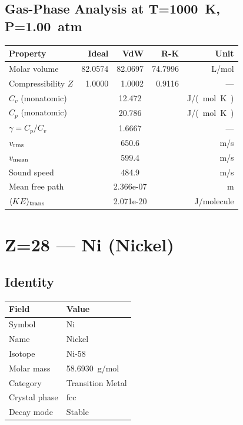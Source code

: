\documentclass[11pt,a4paper]{article}
\begin{document}
\subsection{Gas-Phase Analysis at T=\SI{1000}{K}, P=\SI{1.00}{atm}}
\begin{tabular}{lrrrr}
  \toprule
  Property & Ideal & VdW & R-K & Unit \\
  \midrule
  Molar volume & 82.0574 & 82.0697 & 74.7996 & \si{L/mol} \\
  Compressibility $Z$ & 1.0000 & 1.0002 & 0.9116 & --- \\
  \midrule
  $C_v$ (monatomic) & \multicolumn{3}{c}{12.472} & \si{J/(mol.K)} \\
  $C_p$ (monatomic) & \multicolumn{3}{c}{20.786} & \si{J/(mol.K)} \\
  $\gamma = C_p/C_v$ & \multicolumn{3}{c}{1.6667} & --- \\
  $v_{\rm rms}$ & \multicolumn{3}{c}{650.6} & \si{m/s} \\
  $v_{\rm mean}$ & \multicolumn{3}{c}{599.4} & \si{m/s} \\
  Sound speed & \multicolumn{3}{c}{484.9} & \si{m/s} \\
  Mean free path & \multicolumn{3}{c}{2.366e-07} & \si{m} \\
  $\langle KE \rangle_{\rm trans}$ & \multicolumn{3}{c}{2.071e-20} & \si{J/molecule} \\
  \bottomrule
\end{tabular}

\newpage

\section{Z=28 --- Ni (Nickel)}
\label{sec:Z28}

\subsection{Identity}
\begin{tabular}{ll}
  \toprule
  Field & Value \\
  \midrule
  Symbol & Ni \\
  Name & Nickel \\
  Isotope & Ni-58 \\
  Molar mass & \SI{58.6930}{g/mol} \\
  Category & Transition Metal \\
  Crystal phase & fcc \\
  Decay mode & Stable \\
  \bottomrule
\end{tabular}
\end{document}
